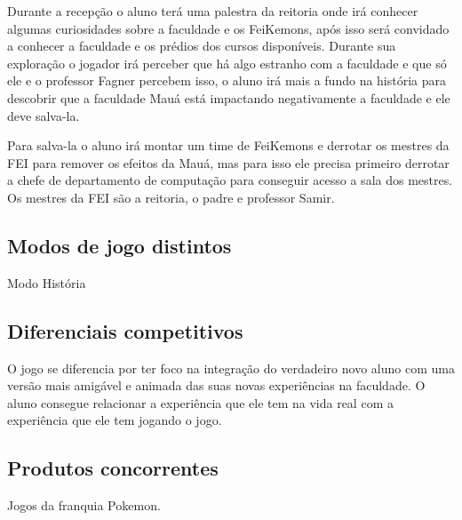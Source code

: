 \documentclass[a4paper,12pt]{article}
\begin{document}
Durante a recepção o aluno terá uma palestra da reitoria onde irá conhecer algumas curiosidades sobre a faculdade e os FeiKemons,
após isso será convidado a conhecer a faculdade e os prédios dos cursos disponíveis. Durante sua exploração o jogador irá perceber que
há algo estranho com a faculdade e que só ele e o professor Fagner percebem isso, o aluno irá mais a fundo na história para descobrir que a faculdade
Mauá está impactando negativamente a faculdade e ele deve salva-la.

Para salva-la o aluno irá montar um time de FeiKemons e derrotar os mestres da FEI para remover os efeitos da Mauá, mas para isso ele precisa primeiro derrotar
a chefe de departamento de computação para conseguir acesso a sala dos mestres.
Os mestres da FEI são a reitoria, o padre e professor Samir.

\subsection{Modos de jogo distintos}
Modo História

\subsection{Diferenciais competitivos}
O jogo se diferencia por ter foco na integração do verdadeiro novo aluno com uma versão mais amigável e animada das suas novas experiências na faculdade. O aluno consegue relacionar a experiência que ele tem na vida real com a experiência que ele tem jogando o jogo.

\subsection{Produtos concorrentes}
Jogos da franquia Pokemon.
\end{document}
